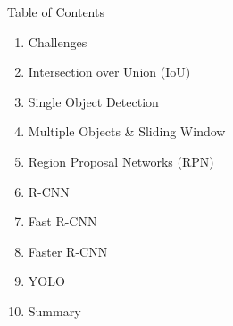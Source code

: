 \begin{frame}[allowframebreaks]{Table of Contents}
\begin{enumerate}
    \item Challenges
    \item Intersection over Union (IoU)
    \item Single Object Detection
    \item Multiple Objects & Sliding Window
    \item Region Proposal Networks (RPN)
    \item R-CNN
    \item Fast R-CNN
    \item Faster R-CNN
    \item YOLO 
    \item Summary
\end{enumerate}
\end{frame}